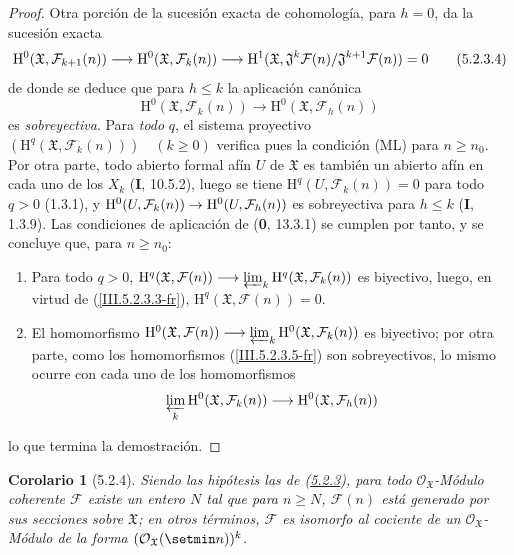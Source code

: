 \documentclass[10pt,oneside,openany]{book}
\theoremstyle{egaenv}\newtheorem*{env}{---}
\theoremstyle{egastatement}
\newtheorem*{corollary}{Corolario}
\theoremstyle{egadescription}
\newcommand{\oldpage}[2][]{\marginnote{\normalfont\scriptsize\textbf{#1}\,|\,#2}\ignorespaces}
\renewcommand{\leq}{\leqslant}
\renewcommand{\geq}{\geqslant}
\renewcommand{\to}{\mathchoice{\longrightarrow}{\rightarrow}{\rightarrow}{\rightarrow}}
\begin{document}
\begin{proof}
Otra porción de la sucesión exacta de cohomología, para $h=0$, da la sucesión
exacta
\begin{equation}
\mathrm H^0(\mathfrak X,\mathcal F_{k+1}(n))\to
\mathrm H^0(\mathfrak X,\mathcal F_k(n))\to
\mathrm H^1(\mathfrak X,
\mathfrak J^k\mathcal F(n)/\mathfrak J^{k+1}\mathcal F(n))=0
\tag{5.2.3.4}
\label{III.5.2.3.4-fr}
\end{equation}
de donde se deduce que para $h\leq k$ la aplicación canónica
\begin{equation}
\mathrm H^0(\mathfrak X,\mathcal F_k(n))\longrightarrow
\mathrm H^0(\mathfrak X,\mathcal F_h(n))
\tag{5.2.3.5}
\label{III.5.2.3.5-fr}
\end{equation}
es \emph{sobreyectiva}. Para \emph{todo} $q$, el sistema proyectivo
$(\mathrm H^q(\mathfrak X,\mathcal F_k(n)))\quad(k\geq0)$ verifica pues la condición
(ML) para $n\geq n_0$. Por otra parte, todo abierto formal afín $U$ de $\mathfrak X$
es también un abierto afín en cada uno de los $X_k$ (\textbf{I}, 10.5.2), luego se tiene
$\mathrm H^q(U,\mathcal F_k(n))=0$ para todo $q>0$ (1.3.1), y
$\mathrm H^0(U,\mathcal F_k(n))\to\mathrm H^0(U,\mathcal F_h(n))$ es sobreyectiva
para $h\leq k$ (\textbf{I}, 1.3.9). Las condiciones de aplicación de (\textbf{0}, 13.3.1) se
cumplen por tanto, y se concluye que, para $n\geq n_0$:
\begin{enumerate}
\item[$1^\circ$] Para todo $q>0$,
$\mathrm H^q(\mathfrak X,\mathcal F(n))\longrightarrow
\varprojlim_k\mathrm H^q(\mathfrak X,\mathcal F_k(n))$
es biyectivo, luego, en virtud de (\ref{III.5.2.3.3-fr}),
$\mathrm H^q(\mathfrak X,\mathcal F(n))=0$.
\item[$2^\circ$] El homomorfismo
$\mathrm H^0(\mathfrak X,\mathcal F(n))\longrightarrow
\varprojlim_k\mathrm H^0(\mathfrak X,\mathcal F_k(n))$
es biyectivo; por otra parte, como los homomorfismos
(\ref{III.5.2.3.5-fr}) son sobreyectivos, lo mismo ocurre con cada uno de los
homomorfismos
\[
\varprojlim_k\mathrm H^0(\mathfrak X,\mathcal F_k(n))
\longrightarrow\mathrm H^0(\mathfrak X,\mathcal F_h(n))
\]
\end{enumerate}
lo que termina la demostración.
\end{proof}

\begin{corollary}[5.2.4]
\label{III.5.2.4-fr}
Siendo las hipótesis las de \textup{(\hyperref[III.5.2.3-fr]{5.2.3})}, para todo
$\mathcal O_{\mathfrak X}$-Módulo coherente $\mathcal F$ existe un entero $N$
tal que para $n\geq N$, $\mathcal F(n)$ está generado por sus secciones sobre
\oldpage[III]{153}
$\mathfrak X$; en otros términos, $\mathcal F$ es isomorfo al cociente de un
$\mathcal O_{\mathfrak X}$-Módulo de la forma
$(\mathcal O_{\mathfrak X}(\setmin n))^k$.
\end{corollary}
\end{document}
